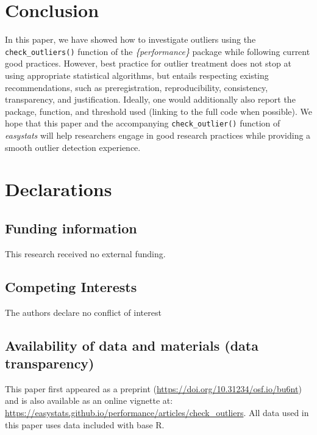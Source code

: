 \documentclass[sn-basic, lineno,pdflatex]{sn-jnl}
\begin{document}
\hypertarget{conclusion}{%
\section{Conclusion}\label{conclusion}}

In this paper, we have showed how to investigate outliers using the
\texttt{check\_outliers()} function of the \emph{\{performance\}}
package while following current good practices. However, best practice
for outlier treatment does not stop at using appropriate statistical
algorithms, but entails respecting existing recommendations, such as
preregistration, reproducibility, consistency, transparency, and
justification. Ideally, one would additionally also report the package,
function, and threshold used (linking to the full code when possible).
We hope that this paper and the accompanying \texttt{check\_outlier()}
function of \emph{easystats} will help researchers engage in good
research practices while providing a smooth outlier detection
experience.

\hypertarget{declarations}{%
\section{Declarations}\label{declarations}}

\hypertarget{funding-information}{%
\subsection{Funding information}\label{funding-information}}

This research received no external funding.

\hypertarget{competing-interests}{%
\subsection{Competing Interests}\label{competing-interests}}

The authors declare no conflict of interest

\hypertarget{availability-of-data-and-materials-data-transparency}{%
\subsection{Availability of data and materials (data
transparency)}\label{availability-of-data-and-materials-data-transparency}}

This paper first appeared as a preprint
(\url{https://doi.org/10.31234/osf.io/bu6nt}) and is also available as
an online vignette at:
\url{https://easystats.github.io/performance/articles/check_outliers}.
All data used in this paper uses data included with base R.
\end{document}
